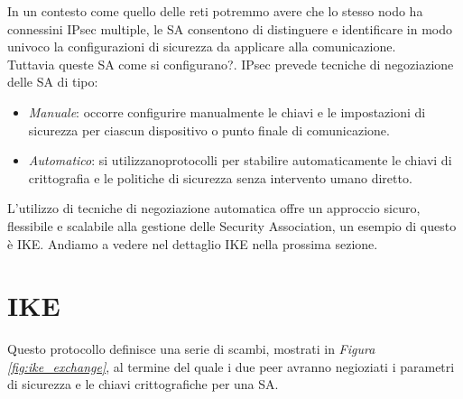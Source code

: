 In un contesto come quello delle reti potremmo avere che lo stesso nodo ha connessini IPsec multiple, 
le SA consentono di distinguere e identificare in modo univoco la configurazioni di sicurezza da applicare alla comunicazione.\\
Tuttavia queste SA come si configurano?.
IPsec prevede tecniche di negoziazione delle SA di tipo:

\begin{itemize}
    \item \textit{Manuale}: occorre configurire manualmente le chiavi e le
    impostazioni di sicurezza per ciascun dispositivo o punto finale di
    comunicazione.
    \item \textit{Automatico}: si utilizzanoprotocolli per stabilire
    automaticamente le chiavi di crittografia e le politiche di sicurezza senza
    intervento umano diretto.
\end{itemize}
\noindent
L'utilizzo di tecniche di negoziazione automatica offre un approccio sicuro, flessibile e scalabile alla gestione delle Security Association, un esempio di questo è IKE.
Andiamo a vedere nel dettaglio IKE nella prossima sezione.

\newpage
\section{IKE}
Questo protocollo definisce una serie di scambi, mostrati in \textit{Figura \ref{fig:ike_exchange}}, al termine del quale i due peer avranno negioziati i parametri di sicurezza e le chiavi crittografiche per una SA.

